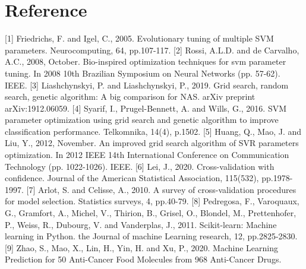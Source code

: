 \section{Reference}
[1] Friedrichs, F. and Igel, C., 2005. Evolutionary tuning of multiple SVM parameters. Neurocomputing, 64, pp.107-117.
[2] Rossi, A.L.D. and de Carvalho, A.C., 2008, October. Bio-inspired optimization techniques for svm parameter tuning. In 2008 10th Brazilian Symposium on Neural Networks (pp. 57-62). IEEE.
[3] Liashchynskyi, P. and Liashchynskyi, P., 2019. Grid search, random search, genetic algorithm: A big comparison for NAS. arXiv preprint arXiv:1912.06059.
[4] Syarif, I., Prugel-Bennett, A. and Wills, G., 2016. SVM parameter optimization using grid search and genetic algorithm to improve classification performance. Telkomnika, 14(4), p.1502.
[5] Huang, Q., Mao, J. and Liu, Y., 2012, November. An improved grid search algorithm of SVR parameters optimization. In 2012 IEEE 14th International Conference on Communication Technology (pp. 1022-1026). IEEE.
[6] Lei, J., 2020. Cross-validation with confidence. Journal of the American Statistical Association, 115(532), pp.1978-1997.
[7] Arlot, S. and Celisse, A., 2010. A survey of cross-validation procedures for model selection. Statistics surveys, 4, pp.40-79.
[8] Pedregosa, F., Varoquaux, G., Gramfort, A., Michel, V., Thirion, B., Grisel, O., Blondel, M., Prettenhofer, P., Weiss, R., Dubourg, V. and Vanderplas, J., 2011. Scikit-learn: Machine learning in Python. the Journal of machine Learning research, 12, pp.2825-2830.
[9] Zhao, S., Mao, X., Lin, H., Yin, H. and Xu, P., 2020. Machine Learning Prediction for 50 Anti-Cancer Food Molecules from 968 Anti-Cancer Drugs.



